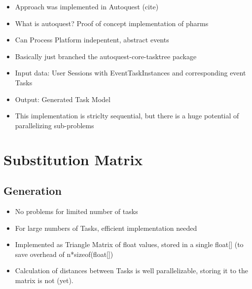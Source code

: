 \begin{itemize}
	\item Approach was implemented in Autoquest (cite)
	\item What is autoquest? Proof of concept implementation of pharms
	\item Can Process Platform indepentent, abstract events
	\item Basically just branched the autoquest-core-tasktree package
	\item Input data: User Sessions with EventTaskInstances and corresponding event Tasks
	\item Output: Generated Task Model
	\item This implementation is striclty sequential, but there is a huge potential of parallelizing sub-problems
\end{itemize}
\section{Substitution Matrix}
\subsection{Generation}
\begin{itemize}
	\item No problems for limited number of tasks
	\item For large numbers of Tasks, efficient implementation needed
	\item Implemented as Triangle Matrix of float values, stored in a single float[] (to save overhead of n*sizeof(float[])
	\item Calculation of distances between Tasks is well parallelizable, storing it to the matrix is not (yet).
\end{itemize}
